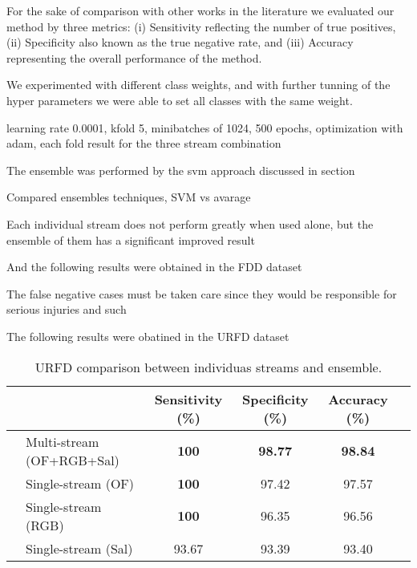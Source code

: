 \documentclass[conference]{IEEEtran}
\begin{document}
For the sake of comparison with other works in the literature we evaluated our method by three metrics: (i) Sensitivity reflecting the number of true positives, (ii) Specificity also known as the true negative rate, and (iii) Accuracy representing the overall performance of the method.

We experimented with different class weights, and with further tunning of the hyper parameters we were able to set all classes with the same weight.

learning rate 0.0001, kfold 5, minibatches of 1024, 500 epochs, optimization with adam, each fold result for the three stream combination

The ensemble was performed by the svm approach discussed in section

Compared ensembles techniques, SVM vs avarage

Each individual stream does not perform greatly when used alone, but the ensemble of them has a significant improved result

And the following results were obtained in the FDD dataset

The false negative cases must be taken care since they would be responsible for serious injuries and such

The following results were obatined in the URFD dataset

\begin{table*}[t]
\centering
\caption{URFD comparison between individuas streams and ensemble.}
\label{tab:urfd-ensem}
\begin{tabular}{llcccl}
\hline
 &  & Sensitivity (\%) & Specificity (\%) & Accuracy (\%) &  \\ \hline
 & Multi-stream (OF+RGB+Sal) & \textbf{100} & \textbf{98.77} & \textbf{98.84} &  \\
 & Single-stream (OF) & \textbf{100} & 97.42 & 97.57 &  \\
 & Single-stream (RGB) & \textbf{100} & 96.35 & 96.56 &  \\
 & Single-stream (Sal) & 93.67 & 93.39 & 93.40 & \\ \hline
\end{tabular}
\end{table*}
\end{document}
